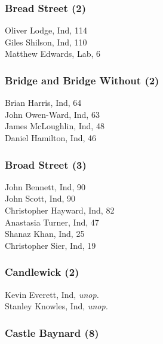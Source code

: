 \documentclass[a4paper,openany,10pt]{book}
\begin{document}
\subsubsection*{Bread Street (2)}



Oliver Lodge, Ind, 114\\
Giles Shilson, Ind, 110\\
Matthew Edwards, Lab, 6\\


\subsubsection*{Bridge and Bridge Without (2)}



Brian Harris, Ind, 64\\
John Owen-Ward, Ind, 63\\
James McLoughlin, Ind, 48\\
Daniel Hamilton, Ind, 46\\


\subsubsection*{Broad Street (3)}



John Bennett, Ind, 90\\
John Scott, Ind, 90\\
Christopher Hayward, Ind, 82\\
Anastasia Turner, Ind, 47\\
Shanaz Khan, Ind, 25\\
Christopher Sier, Ind, 19\\


\subsubsection*{Candlewick (2)}



Kevin Everett, Ind, \emph{unop.}\\
Stanley Knowles, Ind, \emph{unop.}\\


\subsubsection*{Castle Baynard (8)}
\end{document}
